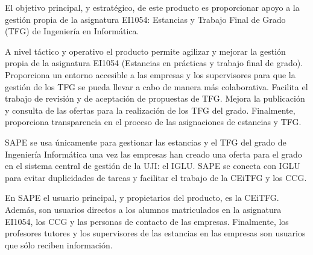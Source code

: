 \documentclass[pdftex,11pt,a4paper]{book}
\begin{document}
El objetivo principal, y estratégico, de este producto es proporcionar apoyo a la gestión propia de la asignatura EI1054: Estancias y Trabajo Final de Grado (TFG) de Ingeniería en Informática.

A nivel táctico y operativo el producto permite agilizar y mejorar la gestión propia de la asignatura EI1054 (Estancias en prácticas y trabajo final de grado). Proporciona un entorno accesible a las empresas y los supervisores para que la gestión de los TFG se pueda llevar a cabo de manera más colaborativa. Facilita el trabajo de revisión y de aceptación de propuestas de TFG. Mejora la publicación y consulta de las ofertas para la realización de los TFG del grado. Finalmente, proporciona transparencia en el proceso de las asignaciones de estancias y TFG.

SAPE se usa únicamente para gestionar las estancias y el TFG del grado de Ingeniería Informática una vez las empresas han creado una oferta para el grado en el sistema central de gestión de la UJI: el IGLU. SAPE se conecta con IGLU para evitar duplicidades de tareas y facilitar el trabajo de la CEiTFG y los CCG. 

En SAPE el usuario principal, y propietarios del producto, es la CEiTFG. Además, son usuarios directos a los alumnos matriculados en la asignatura EI1054, los CCG y las personas de contacto de las empresas. Finalmente, los profesores tutores y los supervisores de las estancias en las empresas son usuarios que sólo reciben información.
\end{document}
